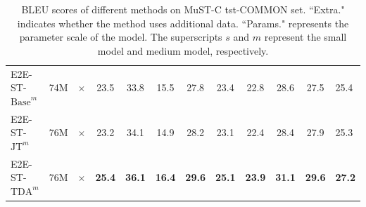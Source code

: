\documentclass[letterpaper]{article} %
\begin{document}
\begin{table}[htb]
{{\begin{tabular}{l|c|c|cccccccc|l}
            E2E-ST-$\text{Base}^{m}$  & 74M  & $\times$      & 23.5 & 33.8 & 15.5 & 27.8 & 23.4 & 22.8 & 28.6 & 27.5 & 25.4  \\ 
            E2E-ST-$\text{JT}^{m}$   &  76M     & $\times$      & 23.2 & 34.1 & 14.9 & 28.2 & 23.1 & 22.4 & 28.4 & 27.9 & 25.3  \\ 
            E2E-ST-$\text{TDA}^{m}$      &   76M      & $\times$ & \textbf{25.4} & \textbf{36.1} & \textbf{16.4} & \textbf{29.6} & \textbf{25.1} & \textbf{23.9} & \textbf{31.1}           & \textbf{29.6} & \textbf{27.2}     \\
            \bottomrule
            \hline
        \end{tabular}}}
    \caption{BLEU scores of different methods on MuST-C tst-COMMON set. ``Extra." indicates whether the method uses additional data. ``Params." represents the parameter scale of the model. The superscripts $s$ and $m$ represent the small model and medium model, respectively.}
    \label{tab:main_results_bleu}
\end{table}

\begin{table}[htb]
    \small
    \normalsize  
    \centering
    \caption{WER scores of different methods on Must-C tst-COMMON set.}
    \label{tab:main_results_wer}
\end{table}
\end{document}
